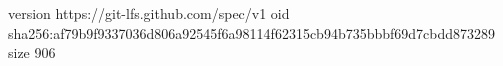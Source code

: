 version https://git-lfs.github.com/spec/v1
oid sha256:af79b9f9337036d806a92545f6a98114f62315cb94b735bbbf69d7cbdd873289
size 906
